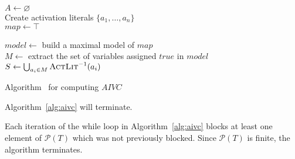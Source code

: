 \begin{algorithm}[t]
  \BlankLine
  $A \leftarrow \varnothing$\\
  Create activation literals $\{a_1, \ldots, a_n\}$ \\
  $map \leftarrow \top$ \\
  \BlankLine

   { \label{alg:aivc:checksat}
    $model \leftarrow $ build a maximal model of $map$  \label{alg:aivc:maxsat} \\
    $M \leftarrow$ extract the set of variables assigned $true$ in $model$ \label{alg:aivc:assignm}\\
    $S \leftarrow \bigcup_{a_i \in M} \textsc{ActLit} ^{-1}(a_i)$ \label{alg:aivc:assigns}\\
\BlankLine
  }
\caption{Algorithm \aivcalg ~for computing $AIVC$}
\label{alg:aivc}
\end{algorithm}


\begin{theorem}
\label{theorem:termination}
  Algorithm~\ref{alg:aivc} will terminate.
\end{theorem}
\begin{IEEEproof}
Each iteration of the while loop in Algorithm~\ref{alg:aivc} blocks at
least one element of $\mathcal{P}(T)$ which was not previously
blocked. Since $\mathcal{P}(T)$ is finite, the algorithm terminates.
\end{IEEEproof}

